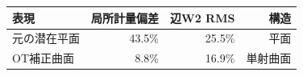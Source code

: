 \begin{tabular}{lrrr}
\toprule
表現 & 局所計量偏差 & 辺W2 RMS & 構造 \\
\midrule
元の潜在平面 & 43.5\% & 25.5\% & 平面 \\
OT補正曲面 & 8.8\% & 16.9\% & 単射曲面 \\
\bottomrule
\end{tabular}
